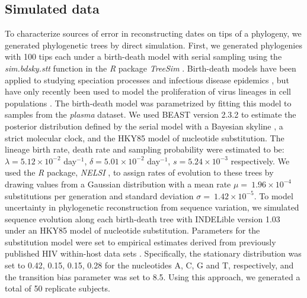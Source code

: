 \documentclass[12pt]{article}
\begin{document}
\subsection*{Simulated data}
To characterize sources of error in reconstructing dates on tips of a phylogeny, we generated phylogenetic trees by direct simulation. %
First, we generated phylogenies with 100 tips each under a birth-death model with serial sampling using the \emph{sim.bdsky.stt} function in the \textit{R} package \textit{TreeSim} \cite{Boskova14}.
Birth-death models have been applied to studying speciation processes \cite{Nee06} and infectious disease epidemics \cite{Stradler13}, but have only recently been used to model the proliferation of virus lineages in cell populations \cite{Hartfield15}.
The birth-death model was parametrized by fitting this model to samples from the {\em plasma} dataset.
We used BEAST version 2.3.2 \cite{BEAST2} to estimate the posterior distribution defined by the serial model with a Bayesian skyline \cite{Stadler13}, a strict molecular clock, and the HKY85 \cite{HKY85} model of nucleotide substitution.
The lineage birth rate, death rate and sampling probability were estimated to be: $\lambda = 5.12 \times 10^{-2}$ day$^{-1}$, $\delta = 5.01 \times 10^{-2}$ day$^{-1}$, $s = 5.24 \times 10^{-3}$ respectively.
We used the \textit{R} package, \emph{NELSI} \cite{NELSI}, to assign rates of evolution to these trees by drawing values from a Gaussian distribution with a mean rate $\mu = \ 1.96\times 10^{-4}$ substitutions per generation and standard deviation $\sigma = \ 1.42\times 10^{-5}$. %
To model uncertainty in phylogenetic reconstruction from sequence variation, we simulated sequence evolution along each birth-death tree with INDELible version 1.03 \cite{Indelible} under an HKY85 \cite{HKY85} model of nucleotide substitution.
Parameters for the substitution model were set to empirical estimates derived from previously published HIV within-host data sets \cite{McCloskey14}. 
Specifically, the stationary distribution was set to 0.42, 0.15, 0.15, 0.28 for the nucleotides A, C, G and T, respectively, and the transition bias parameter was set to 8.5.
Using this approach, we generated a total of 50 replicate subjects.
\end{document}
